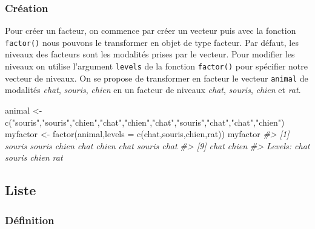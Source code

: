 \documentclass[
]{book}
\newenvironment{Shaded}{\begin{snugshade}}{\end{snugshade}}
\newcommand{\AttributeTok}[1]{\textcolor[rgb]{0.77,0.63,0.00}{#1}}
\newcommand{\CommentTok}[1]{\textcolor[rgb]{0.56,0.35,0.01}{\textit{#1}}}
\newcommand{\FunctionTok}[1]{\textcolor[rgb]{0.00,0.00,0.00}{#1}}
\newcommand{\NormalTok}[1]{#1}
\newcommand{\OtherTok}[1]{\textcolor[rgb]{0.56,0.35,0.01}{#1}}
\newcommand{\StringTok}[1]{\textcolor[rgb]{0.31,0.60,0.02}{#1}}
\begin{document}
\hypertarget{cruxe9ation-1}{%
\subsubsection*{Création}\label{cruxe9ation-1}}

Pour créer un facteur, on commence par créer un vecteur puis avec la fonction \texttt{factor()} nous pouvons le transformer en objet de type facteur. Par défaut, les niveaux des facteurs sont les modalités prises par le vecteur. Pour modifier les niveaux on utilise l'argument \texttt{levels} de la fonction \texttt{factor()} pour spécifier notre vecteur de niveaux.
On se propose de transformer en facteur le vecteur \texttt{animal} de modalités \emph{chat}, \emph{souris}, \emph{chien} en un facteur de niveaux \emph{chat}, \emph{souris}, \emph{chien} et \emph{rat}.

\begin{Shaded}
\begin{Highlighting}[]
\NormalTok{animal }\OtherTok{\textless{}{-}} \FunctionTok{c}\NormalTok{(}\StringTok{"souris"}\NormalTok{,}\StringTok{"souris"}\NormalTok{,}\StringTok{"chien"}\NormalTok{,}\StringTok{"chat"}\NormalTok{,}\StringTok{"chien"}\NormalTok{,}\StringTok{"chat"}\NormalTok{,}\StringTok{"souris"}\NormalTok{,}\StringTok{"chat"}\NormalTok{,}\StringTok{"chat"}\NormalTok{,}\StringTok{"chien"}\NormalTok{)}
\NormalTok{myfactor }\OtherTok{\textless{}{-}} \FunctionTok{factor}\NormalTok{(animal,}\AttributeTok{levels =} \FunctionTok{c}\NormalTok{(}\StringTok{\textquotesingle{}chat\textquotesingle{}}\NormalTok{,}\StringTok{\textquotesingle{}souris\textquotesingle{}}\NormalTok{,}\StringTok{\textquotesingle{}chien\textquotesingle{}}\NormalTok{,}\StringTok{\textquotesingle{}rat\textquotesingle{}}\NormalTok{))}
\NormalTok{myfactor}
\CommentTok{\#\textgreater{}  [1] souris souris chien  chat   chien  chat   souris chat  }
\CommentTok{\#\textgreater{}  [9] chat   chien }
\CommentTok{\#\textgreater{} Levels: chat souris chien rat}
\end{Highlighting}
\end{Shaded}

\hypertarget{list}{%
\subsection{Liste}\label{list}}

\hypertarget{duxe9finition-2}{%
\subsubsection*{Définition}\label{duxe9finition-2}}
\end{document}
